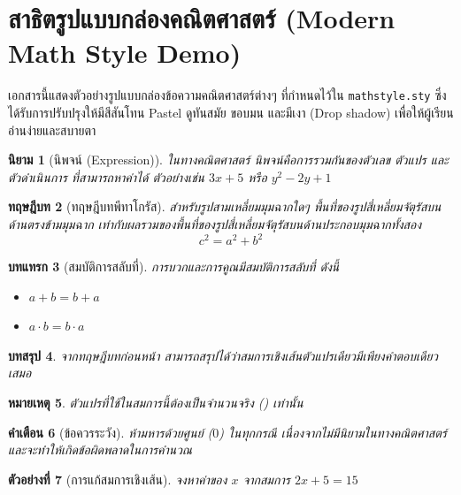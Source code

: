 \documentclass{kkubee_edit_all}
\newtheorem{thrm}{ทฤษฎีบท}[chapter]
\newtheorem{ex}[thrm]{ตัวอย่างที่}
\newtheorem{rem}[thrm]{หมายเหตุ}
\newtheorem{warning}[thrm]{คำเตือน}
\newtheorem{prop}[thrm]{บทแทรก}
\newtheorem{cor}[thrm]{บทสรุป}
\newtheorem{definition}[thrm]{นิยาม}
\begin{document}
\chapter*{สาธิตรูปแบบกล่องคณิตศาสตร์ (Modern Math Style Demo)}

เอกสารนี้แสดงตัวอย่างรูปแบบกล่องข้อความคณิตศาสตร์ต่างๆ ที่กำหนดไว้ใน \texttt{mathstyle.sty} ซึ่งได้รับการปรับปรุงให้มีสีสันโทน Pastel ดูทันสมัย ขอบมน และมีเงา (Drop shadow) เพื่อให้ผู้เรียนอ่านง่ายและสบายตา

\vspace{1cm}

\begin{definition}[นิพจน์ (Expression)]
ในทางคณิตศาสตร์ นิพจน์คือการรวมกันของตัวเลข ตัวแปร และตัวดำเนินการ ที่สามารถหาค่าได้ ตัวอย่างเช่น $3x + 5$ หรือ $y^2 - 2y + 1$
\end{definition}

\begin{thrm}[ทฤษฎีบทพีทาโกรัส]
สำหรับรูปสามเหลี่ยมมุมฉากใดๆ พื้นที่ของรูปสี่เหลี่ยมจัตุรัสบนด้านตรงข้ามมุมฉาก เท่ากับผลรวมของพื้นที่ของรูปสี่เหลี่ยมจัตุรัสบนด้านประกอบมุมฉากทั้งสอง
\[ c^2 = a^2 + b^2 \]
\end{thrm}

\begin{prop}[สมบัติการสลับที่]
การบวกและการคูณมีสมบัติการสลับที่ ดังนี้
\begin{itemize}
    \item $a + b = b + a$
    \item $a \cdot b = b \cdot a$
\end{itemize}
\end{prop}

\begin{cor}
จากทฤษฎีบทก่อนหน้า สามารถสรุปได้ว่าสมการเชิงเส้นตัวแปรเดียวมีเพียงคำตอบเดียวเสมอ
\end{cor}

\begin{rem}
 ตัวแปรที่ใช้ในสมการนี้ต้องเป็นจำนวนจริง () เท่านั้น
\end{rem}

\begin{warning}[ข้อควรระวัง]
ห้ามหารด้วยศูนย์ ($0$) ในทุกกรณี เนื่องจากไม่มีนิยามในทางคณิตศาสตร์ และจะทำให้เกิดข้อผิดพลาดในการคำนวณ
\end{warning}

\begin{ex}[การแก้สมการเชิงเส้น]
จงหาค่าของ $x$ จากสมการ $2x + 5 = 15$
\end{ex}
\end{document}
